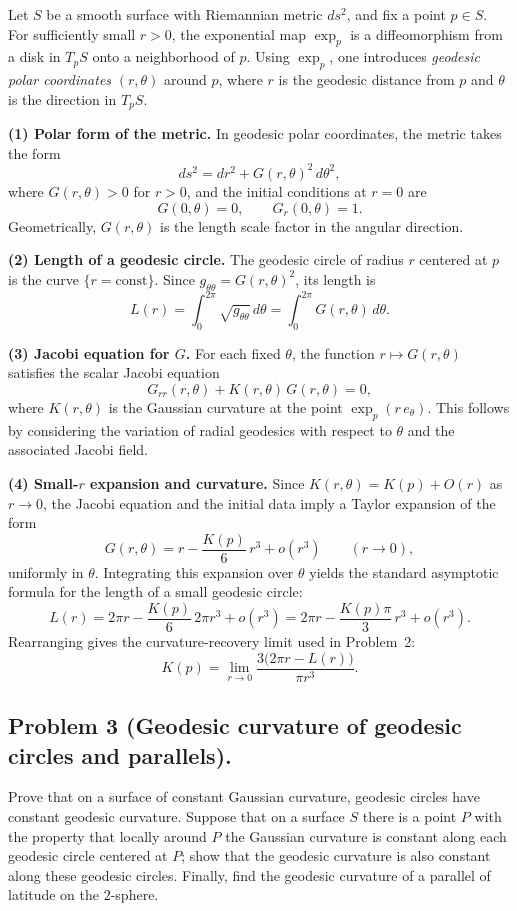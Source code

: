 \documentclass[12pt,a4paper]{article}
\theoremstyle{plain}
\theoremstyle{definition}      %
\begin{document}
Let \(S\) be a smooth surface with Riemannian metric \(ds^{2}\), and fix a point \(p\in S\).
For sufficiently small \(r>0\), the exponential map \(\exp_{p}\) is a diffeomorphism from a
disk in \(T_{p}S\) onto a neighborhood of \(p\). Using \(\exp_{p}\), one introduces
\emph{geodesic polar coordinates} \((r,\theta)\) around \(p\), where \(r\) is the geodesic
distance from \(p\) and \(\theta\) is the direction in \(T_{p}S\).

\medskip
\noindent\textbf{(1) Polar form of the metric.}
In geodesic polar coordinates, the metric takes the form
\[
ds^{2}=dr^{2}+G(r,\theta)^{2}\,d\theta^{2},
\]
where \(G(r,\theta)>0\) for \(r>0\), and the initial conditions at \(r=0\) are
\[
G(0,\theta)=0,\qquad G_{r}(0,\theta)=1.
\]
Geometrically, \(G(r,\theta)\) is the length scale factor in the angular direction.

\medskip
\noindent\textbf{(2) Length of a geodesic circle.}
The geodesic circle of radius \(r\) centered at \(p\) is the curve \(\{r=\text{const}\}\).
Since \(g_{\theta\theta}=G(r,\theta)^{2}\), its length is
\[
L(r)=\int_{0}^{2\pi}\sqrt{g_{\theta\theta}}\,d\theta=\int_{0}^{2\pi}G(r,\theta)\,d\theta.
\]

\medskip
\noindent\textbf{(3) Jacobi equation for \(G\).}
For each fixed \(\theta\), the function \(r\mapsto G(r,\theta)\) satisfies the scalar
Jacobi equation
\[
G_{rr}(r,\theta)+K(r,\theta)\,G(r,\theta)=0,
\]
where \(K(r,\theta)\) is the Gaussian curvature at the point \(\exp_{p}(r\,e_{\theta})\).
This follows by considering the variation of radial geodesics with respect to \(\theta\)
and the associated Jacobi field.

\medskip
\noindent\textbf{(4) Small-\(r\) expansion and curvature.}
Since \(K(r,\theta)=K(p)+O(r)\) as \(r\to 0\), the Jacobi equation and the initial data imply
a Taylor expansion of the form
\[
G(r,\theta)=r-\frac{K(p)}{6}\,r^{3}+o(r^{3}) \qquad (r\to 0),
\]
uniformly in \(\theta\). Integrating this expansion over \(\theta\) yields the standard
asymptotic formula for the length of a small geodesic circle:
\[
L(r)=2\pi r-\frac{K(p)}{6}\,2\pi r^{3}+o(r^{3})
=2\pi r-\frac{K(p)\pi}{3}\,r^{3}+o(r^{3}).
\]
Rearranging gives the curvature-recovery limit used in Problem~2:
\[
K(p)=\lim_{r\to 0}\frac{3\bigl(2\pi r-L(r)\bigr)}{\pi r^{3}}.
\]


\bigskip

\subsection*{Problem 3 (Geodesic curvature of geodesic circles and parallels).}
Prove that on a surface of constant Gaussian curvature, geodesic circles have constant geodesic curvature.
Suppose that on a surface \(S\) there is a point \(P\) with the property that locally around \(P\) the Gaussian curvature is constant along each geodesic circle centered at \(P\); show that the geodesic curvature is also constant along these geodesic circles.
Finally, find the geodesic curvature of a parallel of latitude on the \(2\)-sphere.
\end{document}

